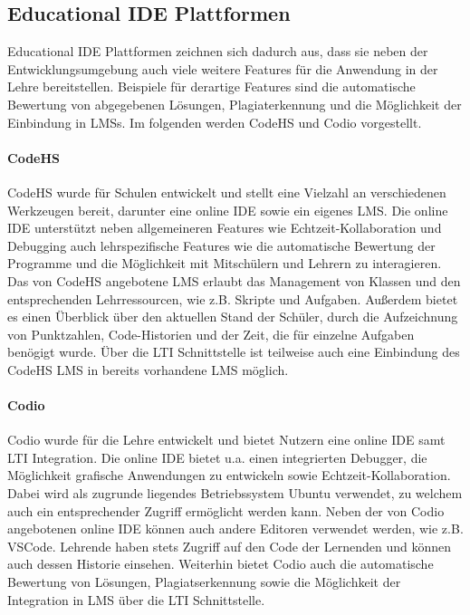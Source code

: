 \subsection{Educational IDE Plattformen}\label{section:stand-der-technik:weitere-entwicklungen:educational-ide-plattformen}

Educational IDE Plattformen zeichnen sich dadurch aus, dass sie neben der Entwicklungsumgebung auch viele weitere Features für die Anwendung in der Lehre bereitstellen. Beispiele für derartige Features sind die automatische Bewertung von abgegebenen Lösungen, Plagiaterkennung und die Möglichkeit der Einbindung in \acp{LMS}. Im folgenden werden CodeHS \cite{noauthor_codehs_nodate} und Codio \cite{noauthor_codio_nodate} vorgestellt.

\paragraph{CodeHS}
CodeHS \cite{noauthor_codehs_nodate} wurde für Schulen entwickelt und stellt eine Vielzahl an verschiedenen Werkzeugen bereit, darunter eine online IDE sowie ein eigenes \ac{LMS}. Die online IDE unterstützt neben allgemeineren Features wie Echtzeit-Kollaboration und Debugging auch lehrspezifische Features wie die automatische Bewertung der Programme und die Möglichkeit mit Mitschülern und Lehrern zu interagieren. Das von CodeHS angebotene \ac{LMS} erlaubt das Management von Klassen und den entsprechenden Lehrressourcen, wie z.B. Skripte und Aufgaben. Außerdem bietet es einen Überblick über den aktuellen Stand der Schüler, durch die Aufzeichnung von Punktzahlen, Code-Historien und der Zeit, die für einzelne Aufgaben benögigt wurde. Über die \ac{LTI} Schnittstelle ist teilweise auch eine Einbindung des CodeHS \ac{LMS} in bereits vorhandene \ac{LMS} möglich.

\paragraph{Codio}
Codio \cite{noauthor_codio_nodate} wurde für die Lehre entwickelt und bietet Nutzern eine online IDE samt \ac{LTI} Integration. Die online IDE bietet u.a. einen integrierten Debugger, die Möglichkeit grafische Anwendungen zu entwickeln sowie Echtzeit-Kollaboration. Dabei wird als zugrunde liegendes Betriebssystem Ubuntu verwendet, zu welchem auch ein entsprechender Zugriff ermöglicht werden kann. Neben der von Codio angebotenen online IDE können auch andere Editoren verwendet werden, wie z.B. \ac{VSCode}. Lehrende haben stets Zugriff auf den Code der Lernenden und können auch dessen Historie einsehen. Weiterhin bietet Codio auch die automatische Bewertung von Lösungen, Plagiatserkennung sowie die Möglichkeit der Integration in \ac{LMS} über die \ac{LTI} Schnittstelle.
